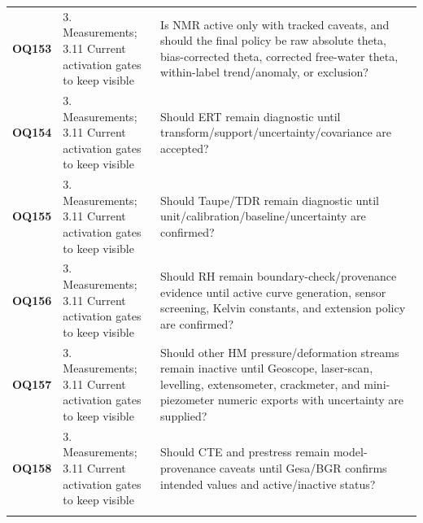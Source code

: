 \begin{longtable}{@{}L{0.10\textwidth} L{0.23\textwidth} L{0.59\textwidth}@{}}
\addlinespace[0.16em]
\textbf{OQ153} & 3. Measurements; 3.11 Current activation gates to keep visible & Is NMR active only with tracked caveats, and should the final policy be raw absolute theta, bias-corrected theta, corrected free-water theta, within-label trend/anomaly, or exclusion?\\
\addlinespace[0.16em]
\textbf{OQ154} & 3. Measurements; 3.11 Current activation gates to keep visible & Should ERT remain diagnostic until transform/support/uncertainty/covariance are accepted?\\
\addlinespace[0.16em]
\textbf{OQ155} & 3. Measurements; 3.11 Current activation gates to keep visible & Should Taupe/TDR remain diagnostic until unit/calibration/baseline/uncertainty are confirmed?\\
\addlinespace[0.16em]
\textbf{OQ156} & 3. Measurements; 3.11 Current activation gates to keep visible & Should RH remain boundary-check/provenance evidence until active curve generation, sensor screening, Kelvin constants, and extension policy are confirmed?\\
\addlinespace[0.16em]
\textbf{OQ157} & 3. Measurements; 3.11 Current activation gates to keep visible & Should other HM pressure/deformation streams remain inactive until Geoscope, laser-scan, levelling, extensometer, crackmeter, and mini-piezometer numeric exports with uncertainty are supplied?\\
\addlinespace[0.16em]
\textbf{OQ158} & 3. Measurements; 3.11 Current activation gates to keep visible & Should CTE and prestress remain model-provenance caveats until Gesa/BGR confirms intended values and active/inactive status?\\
\addlinespace[0.16em]
\end{longtable}
\clearpage
